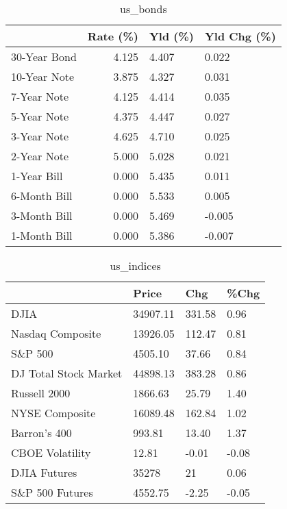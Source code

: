 \documentclass{article}%
\begin{document}
%


\begin{table}[htbp]%
\caption{us\_bonds}%
\centering%
\begin{adjustbox}{width=1\textwidth}%
\begin{tabular}{lrll}
\toprule
             &  Rate (\%) & Yld (\%) & Yld Chg (\%) \\
\midrule
30-Year Bond &     4.125 &   4.407 &       0.022 \\
10-Year Note &     3.875 &   4.327 &       0.031 \\
 7-Year Note &     4.125 &   4.414 &       0.035 \\
 5-Year Note &     4.375 &   4.447 &       0.027 \\
 3-Year Note &     4.625 &   4.710 &       0.025 \\
 2-Year Note &     5.000 &   5.028 &       0.021 \\
 1-Year Bill &     0.000 &   5.435 &       0.011 \\
6-Month Bill &     0.000 &   5.533 &       0.005 \\
3-Month Bill &     0.000 &   5.469 &      -0.005 \\
1-Month Bill &     0.000 &   5.386 &      -0.007 \\
\bottomrule
\end{tabular}
%
\end{adjustbox}%
\end{table}

%


\begin{table}[htbp]%
\caption{us\_indices}%
\centering%
\begin{adjustbox}{width=1\textwidth}%
\begin{tabular}{llll}
\toprule
                      &    Price &    Chg &  \%Chg \\
\midrule
                 DJIA & 34907.11 & 331.58 &  0.96 \\
     Nasdaq Composite & 13926.05 & 112.47 &  0.81 \\
              S\&P 500 &  4505.10 &  37.66 &  0.84 \\
DJ Total Stock Market & 44898.13 & 383.28 &  0.86 \\
         Russell 2000 &  1866.63 &  25.79 &  1.40 \\
       NYSE Composite & 16089.48 & 162.84 &  1.02 \\
         Barron's 400 &   993.81 &  13.40 &  1.37 \\
      CBOE Volatility &    12.81 &  -0.01 & -0.08 \\
         DJIA Futures &    35278 &     21 &  0.06 \\
      S\&P 500 Futures &  4552.75 &  -2.25 & -0.05 \\
\bottomrule
\end{tabular}
%
\end{adjustbox}%
\end{table}
\end{document}
